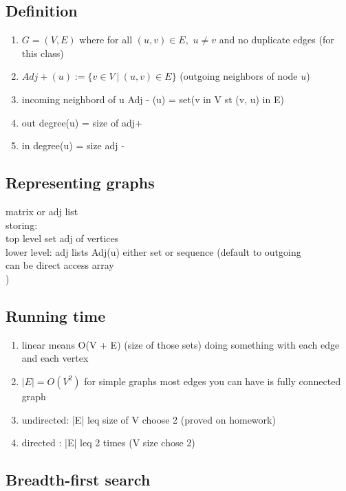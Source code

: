 \documentclass{article}
\begin{document}
    \subsection{Definition}
        \begin{enumerate}
            \item $G = (V, E)$ where for all $(u,v) \in E, $ $u \neq v$ and no duplicate edges (for this class)
            \item $Adj+(u) := \{v \in V ~|~ (u, v) \in E\}$ (outgoing neighbors of node $u$)
            \item incoming neighbord of u Adj - (u) = set(v in V st (v, u) in E)
            \item out degree(u) = size of adj+
            \item in degree(u) = size adj -\\
        \end{enumerate}
    \subsection{Representing graphs}
    matrix or adj list\\
    storing:\\
    top level set adj of vertices\\
    lower level: adj lists Adj(u) either set or sequence (default to outgoing\\
    can be direct access array\\
    )
    \subsection{Running time}
        \begin{enumerate}
            \item linear means O(V + E) (size of those sets)
            \subitem doing something with each edge and each vertex
            \item $|E| = O(V^2)$ for simple graphs
            \subitem most edges you can have is fully connected graph
            \item undirected: |E| leq size of V choose 2 (proved on homework)
            \item directed : |E| leq 2 times (V size chose 2)
        \end{enumerate}



\subsection{Breadth-first search}
\end{document}
